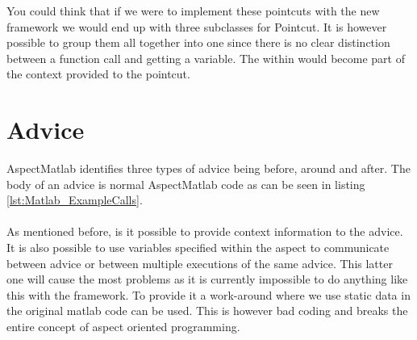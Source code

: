 \documentclass[a4paper]{report}
\begin{document}
You could think that if we were to implement these pointcuts with the new framework we would end up with three subclasses for Pointcut. It is however possible to group them all together into one since there is no clear distinction between a function call and getting a variable. The within would become part of the context provided to the pointcut.

\section{Advice}
AspectMatlab identifies three types of advice being before, around and after. The body of an advice is normal AspectMatlab code as can be seen in listing \ref{lst:Matlab_ExampleCalls}.\\
\\
As mentioned before, is it possible to provide context information to the advice. It is also possible to use variables specified within the aspect to communicate between advice or between multiple executions of the same advice. This latter one will cause the most problems as it is currently impossible to do anything like this with the framework. To provide it a work-around where we use static data in the original matlab code can be used. This is however bad coding and breaks the entire concept of aspect oriented programming.
\end{document}
